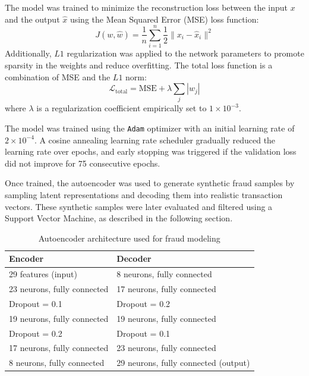 The model was trained to minimize the reconstruction loss between the input $x$ and the output $\hat{x}$ using the Mean Squared Error (MSE) loss function:
\[
J(w, \hat{w}) = \frac{1}{n} \sum_{i=1}^{n} \frac{1}{2} \| x_i - \hat{x}_i \|^2
\]
Additionally, $L1$ regularization was applied to the network parameters to promote sparsity in the weights and reduce overfitting. The total loss function is a combination of MSE and the $L1$ norm:
\[
\mathcal{L}_{\text{total}} = \text{MSE} + \lambda \sum_{j} |w_j|
\]
where $\lambda$ is a regularization coefficient empirically set to $1 \times 10^{-3}$.

The model was trained using the \texttt{Adam} optimizer with an initial learning rate of $2 \times 10^{-4}$. A cosine annealing learning rate scheduler gradually reduced the learning rate over epochs, and early stopping was triggered if the validation loss did not improve for 75 consecutive epochs.

Once trained, the autoencoder was used to generate synthetic fraud samples by sampling latent representations and decoding them into realistic transaction vectors. These synthetic samples were later evaluated and filtered using a Support Vector Machine, as described in the following section.

\begin{table}[htbp]
    \small %
    \centering
    \begin{tabular}{|p{3.5cm}|p{3.5cm}|}
        \hline
        \textbf{Encoder} & \textbf{Decoder} \\
        \hline
        29 features (input) & 8 neurons, fully connected \\
        \hline
        23 neurons, fully connected & 17 neurons, fully connected \\
        \hline
        Dropout = 0.1 & Dropout = 0.2 \\
        \hline
        19 neurons, fully connected & 19 neurons, fully connected \\
        \hline
        Dropout = 0.2 & Dropout = 0.1 \\
        \hline
        17 neurons, fully connected & 23 neurons, fully connected \\
        \hline
        8 neurons, fully connected & 29 neurons, fully connected (output) \\
        \hline
    \end{tabular}
    \caption{Autoencoder architecture used for fraud modeling}
    \label{tab:autoencoder_architecture}
\end{table}

